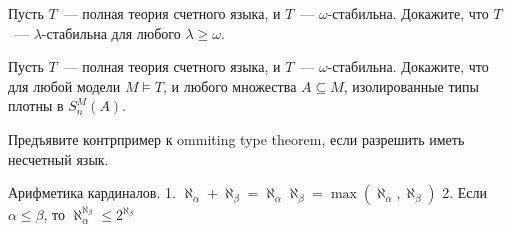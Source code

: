 \setcounter{curtask}{18}



\begin{task}
    Пусть $T$~--- полная теория счетного языка, и $T$~---
    $\omega$-стабильна. Докажите, что $T$~--- $\lambda$-стабильна для любого $\lambda
    \ge \omega$.
\end{task}

\begin{task}
    Пусть $T$~--- полная теория счетного языка, и $T$~---
    $\omega$-стабильна. Докажите, что для любой модели $M \models T$, и любого
    множества $A \subseteq M$, изолированные типы плотны в $S_n^M(A)$. 
\end{task}


\begin{task}
    Предъявите контрпример к ommiting type theorem, если разрешить иметь несчетный
    язык.
\end{task}


\breakline


\begin{ptask}{9}
    Арифметика кардиналов.
    1. $\aleph_{\alpha} + \aleph_{\beta} = \aleph_{\alpha}  \aleph_{\beta} =
    	\max(\aleph_{\alpha}, \aleph_{\beta})$
    2. Если $\alpha \le \beta$, то $\aleph_{\alpha}^{\aleph_{\beta}} \le 2^{\aleph_{\beta}}$
\end{ptask}